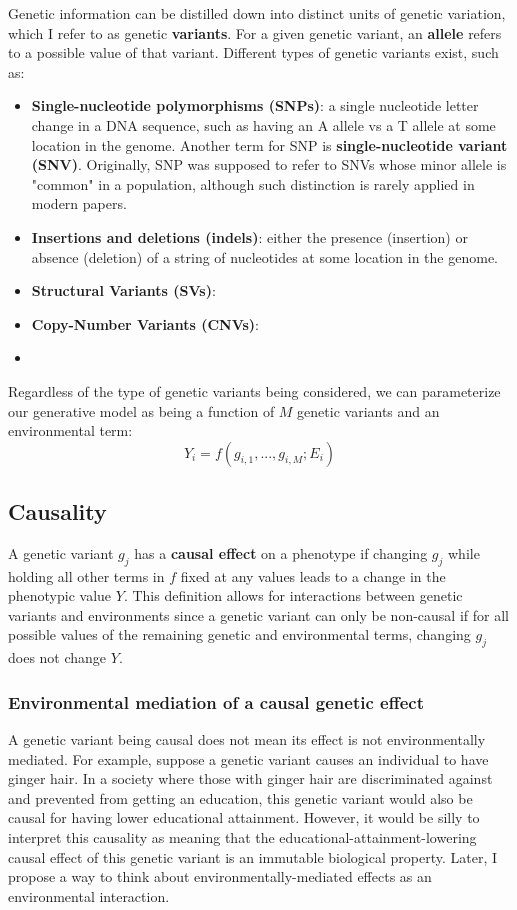 \documentclass[12pt]{article}
\begin{document}
Genetic information can be distilled down into distinct units of genetic variation, which I refer to as genetic \textbf{variants}.
For a given genetic variant, an \textbf{allele} refers to a possible value of that variant.
Different types of genetic variants exist, such as:
\begin{itemize}
    \item \textbf{Single-nucleotide polymorphisms (SNPs)}: a single nucleotide letter change in a DNA sequence, such as having an A allele vs a T allele at some location in the genome.
    Another term for SNP is \textbf{single-nucleotide variant (SNV)}.
    Originally, SNP was supposed to refer to SNVs whose minor allele is "common" in a population, although such distinction is rarely applied in modern papers.
    \item \textbf{Insertions and deletions (indels)}: either the presence (insertion) or absence (deletion) of a string of nucleotides at some location in the genome.
    \item \textbf{Structural Variants (SVs)}: \todo{[To-do]}
    \item \textbf{Copy-Number Variants (CNVs)}: \todo{[To-do]}
    \item \todo{[...]}
\end{itemize}
Regardless of the type of genetic variants being considered, we can parameterize our generative model as being a function of $M$ genetic variants and an environmental term:
$$ Y_i = f(g_{i,1}, ... , g_{i,M};E_i)$$

\subsection{Causality}

A genetic variant $g_j$ has a \textbf{causal effect} on a phenotype if changing $g_j$ while holding all other terms in $f$ fixed at any values leads to a change in the phenotypic value $Y$.
This definition allows for interactions between genetic variants and environments since a genetic variant can only be non-causal if for all possible values of the remaining genetic and environmental terms, changing $g_j$ does not change $Y$.

\subsubsection{Environmental mediation of a causal genetic effect}

A genetic variant being causal does not mean its effect is not environmentally mediated.
For example, suppose a genetic variant causes an individual to have ginger hair. In a society where those with ginger hair are discriminated against and prevented from getting an education, this genetic variant would also be causal for having lower educational attainment.
However, it would be silly to interpret this causality as meaning that the educational-attainment-lowering causal effect of this genetic variant is an immutable biological property.
Later, I propose a way to think about environmentally-mediated effects as an environmental interaction.
\end{document}
